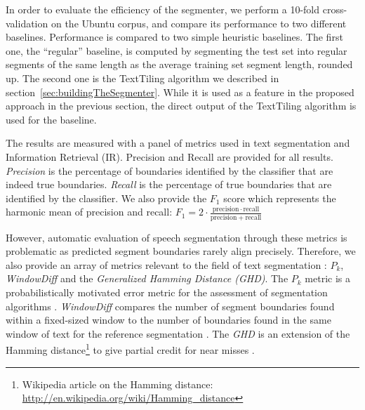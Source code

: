 In order to evaluate the efficiency of the segmenter, we perform a 10-fold cross-validation on the Ubuntu corpus, and compare its performance to two different baselines. 
%
Performance is compared to two simple heuristic baselines. The first one, the ``regular'' baseline, is computed by segmenting the test set into regular segments of the same length as the average training set segment length, rounded up. The second one is the TextTiling algorithm we described in section~\ref{sec:buildingTheSegmenter}.
While it is used as a feature in the proposed approach in the previous section, the direct output of the TextTiling algorithm is used for the baseline.


The results are measured with a panel of metrics used in text segmentation and Information Retrieval (IR).
%
Precision and Recall are provided for all results. \textit{Precision} is the percentage of boundaries identified by the classifier that are indeed true boundaries. \textit{Recall} is the percentage of true boundaries that are identified by the classifier. We also provide the $F_1$ score which represents the harmonic mean of precision and recall:
$  F_1 = 2 \cdot \frac{\mathrm{precision} \cdot \mathrm{recall}}{\mathrm{precision} + \mathrm{recall}}$

However, automatic evaluation of speech segmentation through these metrics is problematic as predicted segment boundaries rarely align precisely. 
Therefore, %
 we also provide an array of metrics relevant to the field of text segmentation : ${P_{k}}$, \textit{WindowDiff} and the \textit{Generalized Hamming Distance (GHD)}.
%
The ${P_{k}}$ metric is a probabilistically motivated error metric for the assessment of segmentation algorithms \cite{beeferman1999statistical}.
%
\textit{WindowDiff} compares the number of segment boundaries found within a fixed-sized window to the number of boundaries found in the same window of text for the reference segmentation \cite{pevzner2002critique}.
%
The \textit{GHD} is an extension of the Hamming distance\footnote{Wikipedia article on the Hamming distance: \url{http://en.wikipedia.org/wiki/Hamming_distance}} to give partial credit for near misses \cite{bookstein2002generalized}.


